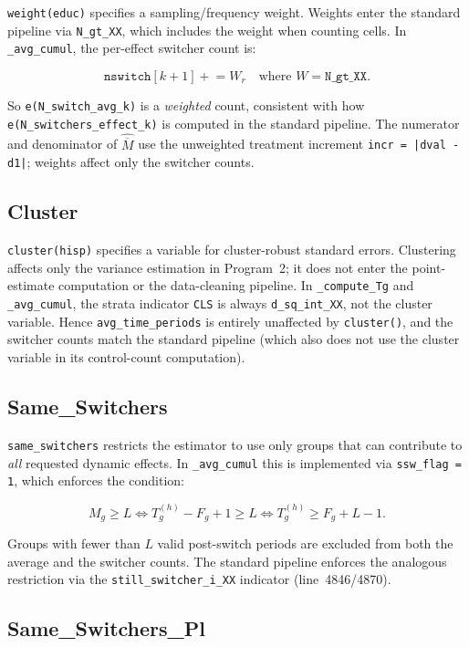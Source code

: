 \documentclass[11pt]{article}
\begin{document}
\texttt{weight(educ)} specifies a sampling/frequency weight. Weights enter the
standard pipeline via \texttt{N\_gt\_XX}, which includes the weight when
counting cells. In \texttt{\_avg\_cumul}, the per-effect switcher count is:

\[
  \texttt{nswitch}[k+1] \mathrel{+}= W_{r}
  \quad \text{where } W = \texttt{N\_gt\_XX}.
\]

So \texttt{e(N\_switch\_avg\_k)} is a \emph{weighted} count, consistent with
how \texttt{e(N\_switchers\_effect\_k)} is computed in the standard pipeline.
The numerator and denominator of $\widehat{\overline{M}}$ use the unweighted
treatment increment \texttt{incr = |dval - d1|}; weights affect only the
switcher counts.

\subsection{Cluster}

\texttt{cluster(hisp)} specifies a variable for cluster-robust standard errors.
Clustering affects only the variance estimation in Program~2; it does not enter
the point-estimate computation or the data-cleaning pipeline. In
\texttt{\_compute\_Tg} and \texttt{\_avg\_cumul}, the strata indicator
\texttt{CLS} is always \texttt{d\_sq\_int\_XX}, not the cluster variable.
Hence \texttt{avg\_time\_periods} is entirely unaffected by \texttt{cluster()},
and the switcher counts match the standard pipeline (which also does not use
the cluster variable in its control-count computation).

\subsection{Same\_Switchers}

\texttt{same\_switchers} restricts the estimator to use only groups that can
contribute to \emph{all} requested dynamic effects. In \texttt{\_avg\_cumul}
this is implemented via \texttt{ssw\_flag = 1}, which enforces the condition:

\[
  M_g \geq L \iff T_g^{(h)} - F_g + 1 \geq L \iff T_g^{(h)} \geq F_g + L - 1.
\]

Groups with fewer than $L$ valid post-switch periods are excluded from both the
average and the switcher counts. The standard pipeline enforces the analogous
restriction via the \texttt{still\_switcher\_i\_XX} indicator (line~4846/4870).

\subsection{Same\_Switchers\_Pl}
\end{document}

